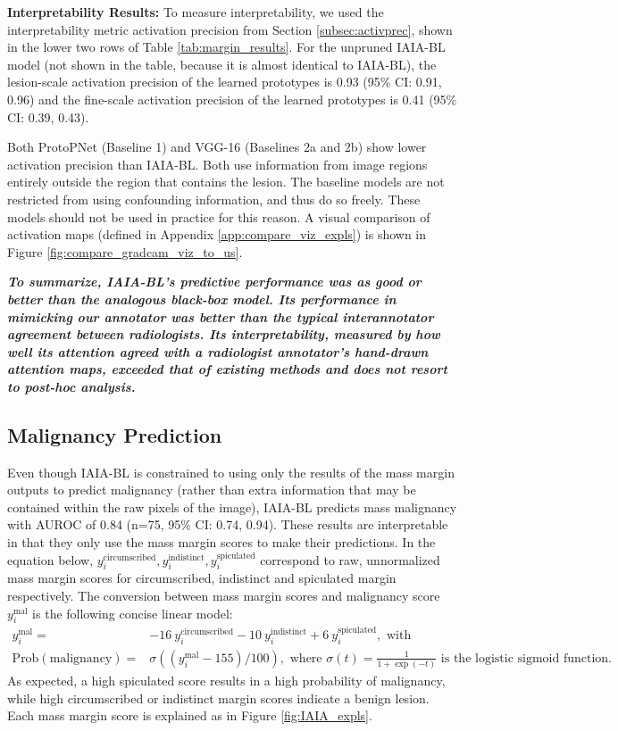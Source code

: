 \documentclass[11pt]{article}
\begin{document}
\textbf{Interpretability Results:} 
    To measure interpretability, we used the interpretability metric activation precision from Section \ref{subsec:activprec}, shown in the lower two rows of Table \ref{tab:margin_results}. For the unpruned IAIA-BL model (not shown in the table, because it is almost identical to IAIA-BL), the lesion-scale activation precision of the learned prototypes is 0.93 (95\% CI: 0.91, 0.96) and the fine-scale activation precision of the learned prototypes is 0.41 (95\% CI: 0.39, 0.43).
    
    Both ProtoPNet (Baseline 1) and VGG-16 (Baselines 2a and 2b) show lower activation precision than IAIA-BL. Both use information from image regions entirely outside the region that contains the lesion. The baseline models are not restricted from using confounding information, and thus do so freely. These models should not be used in practice for this reason. A visual comparison of activation maps (defined in Appendix \ref{app:compare_viz_expls}) is shown in Figure \ref{fig:compare_gradcam_viz_to_us}.

	\textbf{\textit{To summarize, IAIA-BL's predictive performance was as good or better than the analogous black-box model. Its performance in mimicking our annotator was better than the typical interannotator agreement between radiologists. 
	Its interpretability, measured by how well its attention agreed with a radiologist annotator's hand-drawn attention maps, exceeded that of existing methods and does not resort to post-hoc analysis.}}

\subsection{Malignancy Prediction}
\label{sec:results_mal}

Even though IAIA-BL is constrained to using only the results of the mass margin outputs to predict malignancy (rather than extra information that may be contained within the raw pixels of the image), IAIA-BL predicts mass malignancy with AUROC of 0.84 (n=75, 95\% CI: 0.74, 0.94). These results are interpretable in that they only use the mass margin scores to make their predictions. In the equation below, ${y}_i^{\text{circumscribed}}, {y}_i^{\text{indistinct}}, {y}_i^{\text{spiculated}}$ correspond to raw, unnormalized mass margin scores for circumscribed, indistinct and spiculated margin respectively. The conversion between mass margin scores and malignancy score ${y}_i^{\text{mal}}$ is the following concise linear model:
\begin{align}
    {y}_i^{\text{mal}} =& -16~ {y}_i^{\text{circumscribed}} -10 ~{y}_i^{\text{indistinct}} + 6~ {y}_i^{\text{spiculated}}, \text{ with} \\
    \text{Prob}(\text{malignancy}) =& \sigma(({y}_i^{\text{mal}} - 155) / 100 ), \text{ where } \sigma(t) = \frac{1}{1+\exp(-t)} \text{ is the logistic sigmoid function}.
\end{align}
As expected, a high spiculated score results in a high probability of malignancy, while high circumscribed or indistinct margin scores indicate a benign lesion. Each mass margin score is explained as in Figure \ref{fig:IAIA_expls}.
\end{document}
